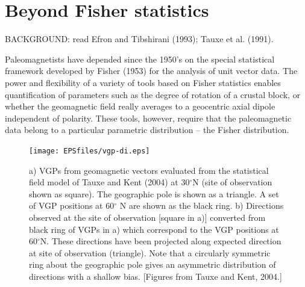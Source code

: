 \chapter{Beyond Fisher statistics}


\noindent
BACKGROUND:  read Efron and Tibshirani (1993); Tauxe  et al. (1991). \nocite{tauxe91} \nocite{efron93}

\vskip 24pt


Paleomagnetists have depended since the 1950's  on the  special statistical
framework developed by  
\nocite{fisher53}
Fisher (1953)  for the analysis of unit vector data.  The power and flexibility of  a variety of tools based on Fisher statistics
enables quantification of  parameters such as the
degree of rotation of a crustal block, or whether the geomagnetic
field really averages to a geocentric axial dipole independent of polarity.
These tools, however, require that the paleomagnetic data belong to a
particular parametric distribution -- the Fisher distribution. 

  \begin{figure}[htb]
\centering  \texttt{[image: EPSfiles/vgp-di.eps]}
\caption{a) VGPs from geomagnetic vectors evaluated from the statistical field model of Tauxe and Kent (2004) at 30$^{\circ}$N (site of observation shown as square).  The geographic pole is shown as  a triangle.  A set of VGP positions at 60$^{\circ}$ N are shown as the black ring.  b) Directions observed at the site of observation [square in a)] converted from  black ring of VGPs in a)  which correspond to the VGP positions at 60$^{\circ}$N.  These directions have been projected along expected direction at site of observation (triangle).  Note that a circularly symmetric ring about the geographic pole gives an asymmetric distribution of directions with a shallow bias. [Figures from Tauxe and Kent, 2004.]}
\label{fig:vgp-di}
\end{figure}\nocite{tauxe04d}




